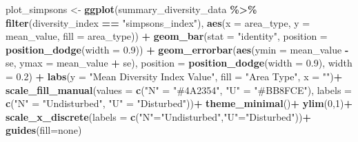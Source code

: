 \documentclass[
]{article}
\newenvironment{Shaded}{\begin{snugshade}}{\end{snugshade}}
\newcommand{\AttributeTok}[1]{\textcolor[rgb]{0.13,0.29,0.53}{#1}}
\newcommand{\DecValTok}[1]{\textcolor[rgb]{0.00,0.00,0.81}{#1}}
\newcommand{\FloatTok}[1]{\textcolor[rgb]{0.00,0.00,0.81}{#1}}
\newcommand{\FunctionTok}[1]{\textcolor[rgb]{0.13,0.29,0.53}{\textbf{#1}}}
\newcommand{\NormalTok}[1]{#1}
\newcommand{\OtherTok}[1]{\textcolor[rgb]{0.56,0.35,0.01}{#1}}
\newcommand{\SpecialCharTok}[1]{\textcolor[rgb]{0.81,0.36,0.00}{\textbf{#1}}}
\newcommand{\StringTok}[1]{\textcolor[rgb]{0.31,0.60,0.02}{#1}}
\begin{document}
\begin{Shaded}
\begin{Highlighting}[]
\NormalTok{  plot\_simpsons }\OtherTok{\textless{}{-}} \FunctionTok{ggplot}\NormalTok{(summary\_diversity\_data }\SpecialCharTok{\%\textgreater{}\%} \FunctionTok{filter}\NormalTok{(diversity\_index }\SpecialCharTok{==} \StringTok{"simpsons\_index"}\NormalTok{), }
                          \FunctionTok{aes}\NormalTok{(}\AttributeTok{x =}\NormalTok{ area\_type, }\AttributeTok{y =}\NormalTok{ mean\_value, }\AttributeTok{fill =}\NormalTok{ area\_type)) }\SpecialCharTok{+}
    \FunctionTok{geom\_bar}\NormalTok{(}\AttributeTok{stat =} \StringTok{"identity"}\NormalTok{, }\AttributeTok{position =} \FunctionTok{position\_dodge}\NormalTok{(}\AttributeTok{width =} \FloatTok{0.9}\NormalTok{)) }\SpecialCharTok{+}
    \FunctionTok{geom\_errorbar}\NormalTok{(}\FunctionTok{aes}\NormalTok{(}\AttributeTok{ymin =}\NormalTok{ mean\_value }\SpecialCharTok{{-}}\NormalTok{ se, }\AttributeTok{ymax =}\NormalTok{ mean\_value }\SpecialCharTok{+}\NormalTok{ se), }
                  \AttributeTok{position =} \FunctionTok{position\_dodge}\NormalTok{(}\AttributeTok{width =} \FloatTok{0.9}\NormalTok{), }
                  \AttributeTok{width =} \FloatTok{0.2}\NormalTok{) }\SpecialCharTok{+}
    \FunctionTok{labs}\NormalTok{(}\AttributeTok{y =} \StringTok{"Mean Diversity Index Value"}\NormalTok{, }\AttributeTok{fill =} \StringTok{"Area Type"}\NormalTok{, }\AttributeTok{x =} \StringTok{""}\NormalTok{)}\SpecialCharTok{+}
    \FunctionTok{scale\_fill\_manual}\NormalTok{(}\AttributeTok{values =} \FunctionTok{c}\NormalTok{(}\StringTok{"N"} \OtherTok{=} \StringTok{"\#4A2354"}\NormalTok{, }\StringTok{"U"} \OtherTok{=} \StringTok{"\#BB8FCE"}\NormalTok{), }\AttributeTok{labels =} \FunctionTok{c}\NormalTok{(}\StringTok{"N"} \OtherTok{=} \StringTok{"Undisturbed"}\NormalTok{, }\StringTok{"U"} \OtherTok{=} \StringTok{"Disturbed"}\NormalTok{))}\SpecialCharTok{+}
    \FunctionTok{theme\_minimal}\NormalTok{()}\SpecialCharTok{+}
    \FunctionTok{ylim}\NormalTok{(}\DecValTok{0}\NormalTok{,}\DecValTok{1}\NormalTok{)}\SpecialCharTok{+}
    \FunctionTok{scale\_x\_discrete}\NormalTok{(}\AttributeTok{labels =} \FunctionTok{c}\NormalTok{(}\StringTok{"N"}\OtherTok{=}\StringTok{"Undisturbed"}\NormalTok{,}\StringTok{"U"}\OtherTok{=}\StringTok{"Disturbed"}\NormalTok{))}\SpecialCharTok{+}
    \FunctionTok{guides}\NormalTok{(}\AttributeTok{fill=}\StringTok{\textquotesingle{}none\textquotesingle{}}\NormalTok{)}
\end{Highlighting}
\end{Shaded}
\end{document}
